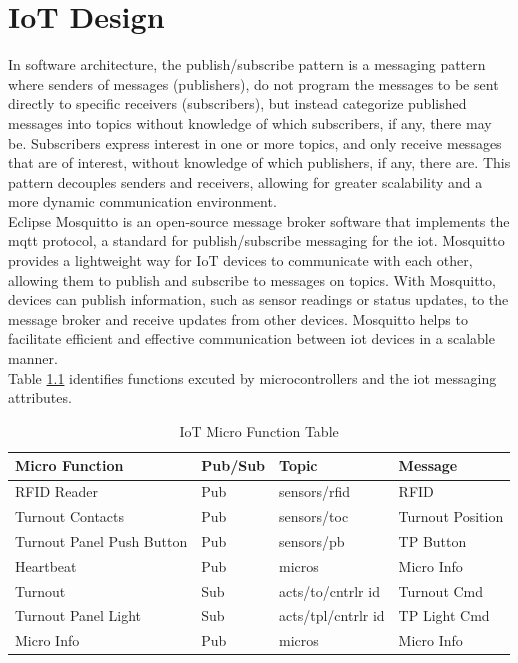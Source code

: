 \chapter{IoT Design}

In software architecture, the publish/subscribe pattern is a messaging pattern where senders of messages (publishers), do not program the messages to be sent directly to specific receivers (subscribers), but instead categorize published messages into topics without knowledge of which subscribers, if any, there may be. Subscribers express interest in one or more topics, and only receive messages that are of interest, without knowledge of which publishers, if any, there are. This pattern decouples senders and receivers, allowing for greater scalability and a more dynamic communication environment.\vspace{5mm} \\
Eclipse Mosquitto is an open-source message broker software that implements the \gls{mqtt} protocol, a standard for publish/subscribe messaging for the \gls{iot}. Mosquitto provides a lightweight way for IoT devices to communicate with each other, allowing them to publish and subscribe to messages on topics. With Mosquitto, devices can publish information, such as sensor readings or status updates, to the message broker and receive updates from other devices. Mosquitto helps to facilitate efficient and effective communication between \gls{iot} devices in a scalable manner.\vspace{5mm} \\
Table \ref{iot-table} identifies functions excuted by microcontrollers and the \gls{iot} messaging attributes.\vspace{5mm} \\

\begin{table}[!ht]
    \begin{center}
    \begin{tabular}{|l|l|l|l|}
    \hline
        \textbf{Micro Function} & \textbf{Pub/Sub} & \textbf{Topic} & \textbf{Message} \\ \hline
        RFID Reader & Pub & sensors/rfid & RFID \\ \hline
        Turnout Contacts & Pub & sensors/toc & Turnout Position\\ \hline
        Turnout Panel Push Button & Pub & sensors/pb & TP Button \\ \hline
        Heartbeat & Pub & micros & Micro Info\\ \hline
        Turnout & Sub & acts/to/cntrlr id &  Turnout Cmd\\ \hline
        Turnout Panel Light & Sub & acts/tpl/cntrlr id & TP Light Cmd\\ \hline
        Micro Info & Pub & micros & Micro Info\\ \hline
    \end{tabular}
    \caption{\label{iot-table}IoT Micro Function Table}
    \end{center}
\end{table}

